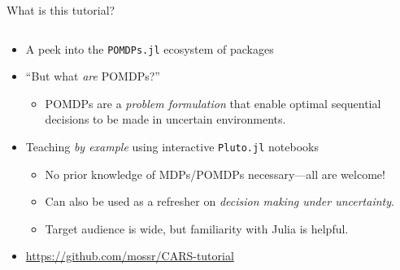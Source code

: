 \begin{frame}[fragile]{What is this tutorial?}
\begin{columns}[T,onlytextwidth]
\begin{column}{0.65\linewidth}
{\begin{itemize}
            \item A peek into the \texttt{POMDPs.jl} ecosystem of \textbf{\large{\julialogo}} packages
            \item ``But what \textit{are} POMDPs?''
            {\footnotesize
            \begin{itemize}
                \item POMDPs are a \textit{problem formulation} that enable optimal\footnotemark{} sequential decisions to be made in uncertain environments.
            \end{itemize}}
            \item Teaching \textit{by example} using interactive \texttt{Pluto.jl} notebooks
            {\footnotesize
            \begin{itemize}
                \item No prior knowledge of MDPs/POMDPs necessary---all are welcome!
                \item Can also be used as a refresher on \textit{decision making under uncertainty}.
                \item Target audience is wide, but familiarity with Julia is helpful.
            \end{itemize}}
            \item \url{https://github.com/mossr/CARS-tutorial}
        \end{itemize}
        }
    \end{column}
\end{columns}
\end{frame}


